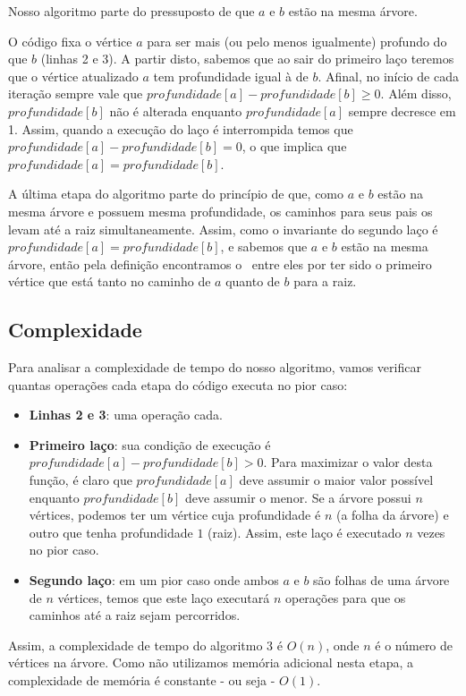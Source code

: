 Nosso algoritmo parte do pressuposto de que $a$ e $b$ estão na mesma árvore.

O código fixa o vértice $a$ para ser mais (ou pelo menos igualmente) profundo do que $b$ (linhas 2 e 3). A partir disto, sabemos que ao sair do primeiro laço teremos que o vértice atualizado $a$ tem profundidade igual à de $b$. Afinal, no início de cada iteração sempre vale que $profundidade[a] - profundidade[b] \geq 0$. Além disso, $profundidade[b]$ não é alterada enquanto $profundidade[a]$ sempre decresce em 1. Assim, quando a execução do laço é interrompida temos que $profundidade[a] - profundidade[b] = 0$, o que implica que  $profundidade[a] = profundidade[b]$.

A última etapa do algoritmo parte do princípio de que, como $a$ e $b$ estão na mesma árvore e possuem mesma profundidade, os caminhos para seus pais os levam até a raiz simultaneamente. Assim, como o invariante do segundo laço é $profundidade[a] = profundidade[b]$, e sabemos que $a$ e $b$ estão na mesma árvore, então pela definição encontramos o \LCA\ entre eles por ter sido o primeiro vértice que está tanto no caminho de $a$ quanto de $b$ para a raiz.


\subsection{Complexidade}

Para analisar a complexidade de tempo do nosso algoritmo, vamos verificar quantas operações cada etapa do código executa no pior caso:

\begin{itemize}
    \item \textbf{Linhas 2 e 3}: uma operação cada.
    \item \textbf{Primeiro laço}: sua condição de execução é $profundidade[a] - profundidade[b] > 0$. Para maximizar o valor desta função, é claro que $profundidade[a]$ deve assumir o maior valor possível enquanto $profundidade[b]$ deve assumir o menor. Se a árvore possui $n$ vértices, podemos ter um vértice cuja profundidade é $n$ (a folha da árvore) e outro que tenha profundidade $1$ (raiz). Assim, este laço é executado $n$ vezes no pior caso.
    \item \textbf{Segundo laço}: em um pior caso onde ambos $a$ e $b$ são folhas de uma árvore de $n$ vértices, temos que este laço executará $n$ operações para que os caminhos até a raiz sejam percorridos.
\end{itemize}

Assim, a complexidade de tempo do algoritmo 3 é $O(n)$, onde $n$ é o número de vértices na árvore. Como não utilizamos memória adicional nesta etapa, a complexidade de memória é constante - ou seja - $O(1)$.